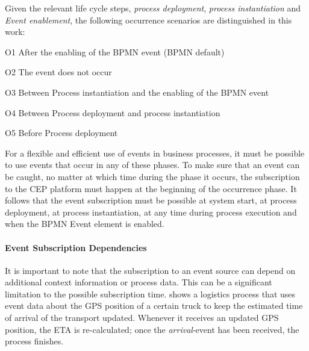 Given the relevant life cycle steps, \textit{process deployment}, \textit{process instantiation} and \textit{Event enablement}, the following occurrence scenarios are distinguished in this work:
\begin{aenumerate}
	\item O1 After the enabling of the BPMN event (BPMN default)
	\item O2 The event does not occur
	\item O3 Between Process instantiation and the enabling of the BPMN event
	\item O4 Between Process deployment and process instantiation
	\item O5 Before Process deployment
\end{aenumerate}\label{def:occurrence-times}


For a flexible and efficient use of events in business processes, it must be possible to use events that occur in any of these phases.
To make sure that an event can be caught, no matter at which time during the phase it occurs, the subscription to the CEP platform must happen at the beginning of the occurrence phase.
It follows that the event subscription must be possible at system start, at process deployment, at process instantiation, at any time during process execution and when the BPMN Event element is enabled.


\paragraph{Event Subscription Dependencies}
It is important to note that the subscription to an event source can depend on additional context information or process data. This can be a significant limitation to the possible subscription time.
 shows a logistics process that uses event data about the GPS position of a certain truck to keep the estimated time of arrival of the transport updated. Whenever it receives an updated GPS position, the ETA is re-calculated; once the \textit{arrival}-event has been received, the process finishes.


